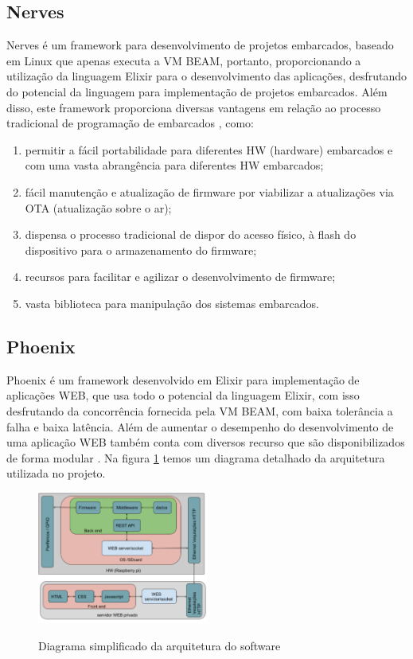 \documentclass[../../layout.tex]{subfiles}
\begin{document}
\subsection{Nerves}
\hspace*{3em}Nerves é um framework para desenvolvimento de projetos embarcados, baseado em Linux que apenas executa a VM BEAM, portanto, proporcionando a utilização da linguagem Elixir para o desenvolvimento das aplicações,  desfrutando do potencial da linguagem para implementação de projetos embarcados. Além disso, este framework proporciona diversas vantagens em relação ao processo tradicional de programação de embarcados \cite{nerves}, como:
\begin{enumerate}[label=\alph*)]
\itemsep0em
    \item permitir a fácil portabilidade para diferentes HW (hardware) embarcados e com uma vasta abrangência para diferentes HW embarcados;
    \item fácil manutenção e atualização de firmware por viabilizar a atualizações via OTA (atualização sobre o ar);
    \item dispensa o processo tradicional de dispor do acesso físico, à flash do dispositivo para o armazenamento do firmware;
    \item recursos para facilitar e agilizar o desenvolvimento de firmware;
    \item vasta biblioteca para manipulação dos sistemas embarcados.
\end{enumerate}

\subsection{Phoenix}
\hspace*{3em}Phoenix é um framework desenvolvido em Elixir para implementação de aplicações WEB, que usa todo o potencial da linguagem Elixir, com isso desfrutando da concorrência fornecida pela VM BEAM, com baixa tolerância a falha e baixa latência.  Além de aumentar o desempenho do desenvolvimento de uma aplicação WEB também conta com diversos recurso que são disponibilizados de forma modular \cite{phoenix}.
\hspace*{3em}Na figura \ref{fig:diagrama_sw} temos um diagrama detalhado da arquitetura utilizada no projeto.

\begin{figure}[H]
\centering
\caption{Diagrama simplificado da arquitetura do software}
\includegraphics[width=0.5\textwidth]{assets/static/img/diagrama_tcc.jpg}
\label{fig:diagrama_sw}
\end{figure}
\end{document}
